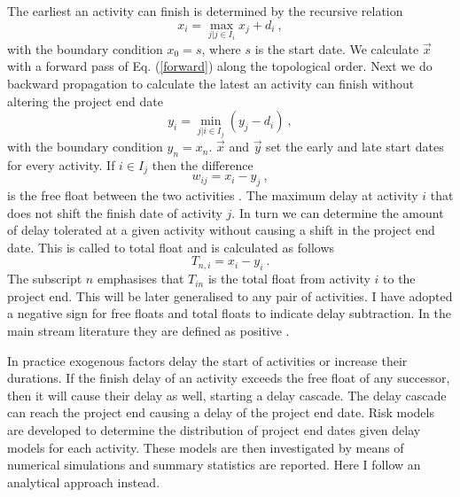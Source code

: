 \documentclass[reprint,aps,prl,amsmath,amssymb,superscriptaddress,showpacs]{revtex4-1}
\begin{document}
The earliest an activity can finish is determined by the recursive relation
%
\begin{equation}
x_i = \max_{j|j\in I_i} x_j + d_i\ ,
\label{forward} 
\end{equation}
%
with the boundary condition $x_0=s$, where $s$ is the start date. We calculate $\vec{x}$ with a forward pass of  Eq. (\ref{forward}) along the topological order. Next we do backward propagation to calculate the latest an activity can finish without altering the project end date
%
\begin{equation}
y_i = \min_{j|i \in I_j} \left(y_j - d_i\right)\ ,
\label{backward} 
\end{equation}
%
with the boundary condition $y_n=x_n$. $\vec{x}$ and $\vec{y}$ set the early and late start dates for every activity. If $i\in I_j$ then the difference 
%
\begin{equation}
w_{ij} = x_i - y_j\ ,
\label{w}
\end{equation}
%
is the free float between the two activities \cite{van13}. The maximum delay at activity $i$ that does not shift the finish date of activity $j$. In turn we can determine the amount of delay tolerated at a given activity without causing a shift in the project end date. This is called to total float and is calculated as follows
%
\begin{equation}
T_{n,i} = x_i-y_i\ .
\label{Tn} 
\end{equation}
%
The subscript $n$ emphasises that $T_{in}$ is the total float from activity $i$ to the project end. This will be later generalised to any pair of activities. I have adopted a negative sign for free floats and total floats to indicate delay subtraction. In the main stream literature they are defined as positive \cite{van13}.

In practice exogenous factors delay the start of activities or increase their durations. If the finish delay of an activity exceeds the free float of any successor, then it will cause their delay as well, starting a delay cascade. The delay cascade can reach the project end causing a delay of the project end date. Risk models are developed to determine the distribution of project end dates given delay models for each activity. These models are then investigated by means of numerical simulations and summary statistics are reported. Here I follow an analytical approach instead.
\end{document}
